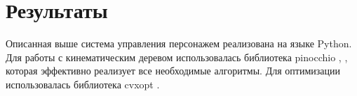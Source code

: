 \section{Результаты}

Описанная выше система управления персонажем реализована на языке Python. Для работы с кинематическим деревом использовалась библиотека pinocchio \cite{Carpentier}, \cite{Pinocchio}, которая эффективно реализует все необходимые алгоритмы. Для оптимизации использовалась библиотека cvxopt \cite{CVXOPT}.


